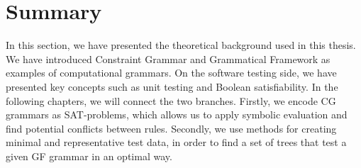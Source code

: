 \section{Summary}

In this section, we have presented the theoretical background used in this thesis. 
We have introduced Constraint Grammar and Grammatical Framework as examples of computational grammars.
On the software testing side, we have presented key concepts such as unit testing and 
Boolean satisfiability. %
In the following chapters, we will connect the two branches. Firstly, we encode CG grammars as SAT-problems, which allows us to apply symbolic evaluation and find potential conflicts between rules. 
Secondly, we use methods for creating minimal and representative test data, in order to find a set of trees that test a given GF grammar in an optimal way.



